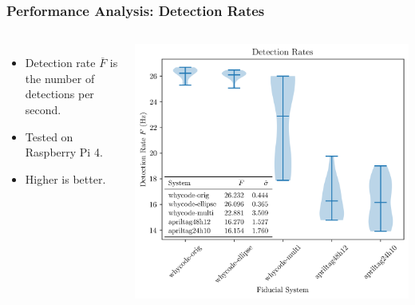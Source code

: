 \documentclass[aspectratio=169]{rubeamer}
\newif\ifpause
\newcommand{\mypause}{\ifpause \pause \fi}
\begin{document}
\begin{frame}
  \frametitle{Performance Analysis: Detection Rates}
  \begin{columns}
      \centering
      \begin{itemize}
        \item Detection rate $\overline{F}$ is the number of detections per second.
        \mypause
        \item Tested on Raspberry Pi 4.
        \mypause
        \item Higher is better.
      \end{itemize}
      \centering
    \onslide
      \includegraphics[width=\textwidth]{violin_plot_speed_five_member}
  \end{columns}
\end{frame}
\end{document}
